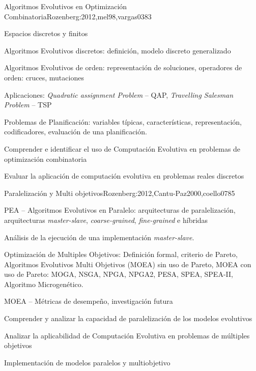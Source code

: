 \begin{syllabus}
\begin{unit}{Algoritmos Evolutivos en Optimización Combinatoria}{Rozenberg:2012,mel98,vargas03}{8}{3}
\begin{topics}
  \item Espacios discretos y finitos
	\item Algoritmos Evolutivos discretos: definición, modelo discreto generalizado
  \item Algoritmos Evolutivos de orden: representación de soluciones, operadores de orden: cruces, mutaciones
	\item Aplicaciones: {\it Quadratic assignment Problem} -- QAP, {\it Travelling Salesman Problem} -- TSP
	\item Problemas de Planificación: variables típicas, características, representación, codificadores, evaluación de una planificación. 
\end{topics}
\begin{unitgoals}
  \item Comprender e identificar el uso de Computación Evolutiva en problemas de optimización combinatoria
  \item Evaluar la aplicación de computación evolutiva en problemas reales discretos
\end{unitgoals}
\end{unit}

\begin{unit}{Paralelización y Multi objetivos}{Rozenberg:2012,Cantu-Paz2000,coello07}{8}{5}
\begin{topics}
  \item PEA -- Algoritmos Evolutivos en Paralelo: arquitecturas de paralelización, arquitecturas {\it master-slave}, {\it coarse-grained}, {\it fine-grained} e híbridas 
  \item Análisis de la ejecución de una implementación {\it master-slave}.
  \item Optimización de Multiples Objetivos: Definición formal, criterio de Pareto, Algoritmos Evolutivos Multi Objetivos (MOEA) sin uso de Pareto, MOEA con uso de Pareto: MOGA, NSGA, NPGA, NPGA2, PESA, SPEA, SPEA-II, Algoritmo Microgenético. 
	\item MOEA -- Métricas de desempeño, investigación futura
\end{topics}
\begin{unitgoals}
  \item Comprender y analizar la capacidad de paralelización de los modelos evolutivos
  \item Analizar la aplicabilidad de Computación Evolutiva en problemas de múltiples objetivos
  \item Implementación de modelos paralelos y multiobjetivo
\end{unitgoals}
\end{unit}


\end{syllabus}
